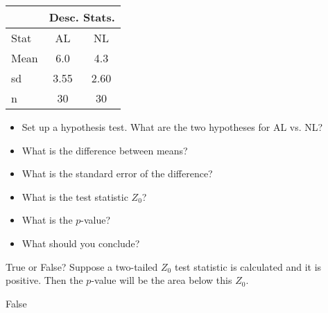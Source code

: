 \documentclass[11pt]{book}\usepackage[]{graphicx}\usepackage[]{color}
\begin{document}
\begin{exercises}
\begin{exercise}
\begin{table}[htbp]
   \centering
   \begin{tabular}{@{} lcc @{}}  \hline%
       & \multicolumn{2}{c}{Desc. Stats.}  \\ \hline
      Stat & AL & NL \\
      Mean & 6.0 & 4.3 \\
      sd   & 3.55 & 2.60  \\
      n    & 30 & 30 \\ \hline
   \end{tabular}
   \label{tab:tbl13a}
\end{table}

\begin{itemize}
  \item Set up a hypothesis test. What are the two hypotheses for AL vs. NL?
  \item What is the difference between means?
  \item What is the standard error of the difference?
  \item What is the test statistic $Z_0$?
  \item What is the $p$-value?
  \item What should you conclude?
\end{itemize}

\end{exercise}
% 
% 

\begin{exercise} %

True or False? Suppose a two-tailed $Z_0$ test statistic is calculated and it is positive. Then the $p$-value will be the area below this $Z_0$.

\end{exercise}
\begin{solution} %

False

\end{solution}

\begin{exercise} %


\end{exercise}
\end{exercises}
\end{document}
